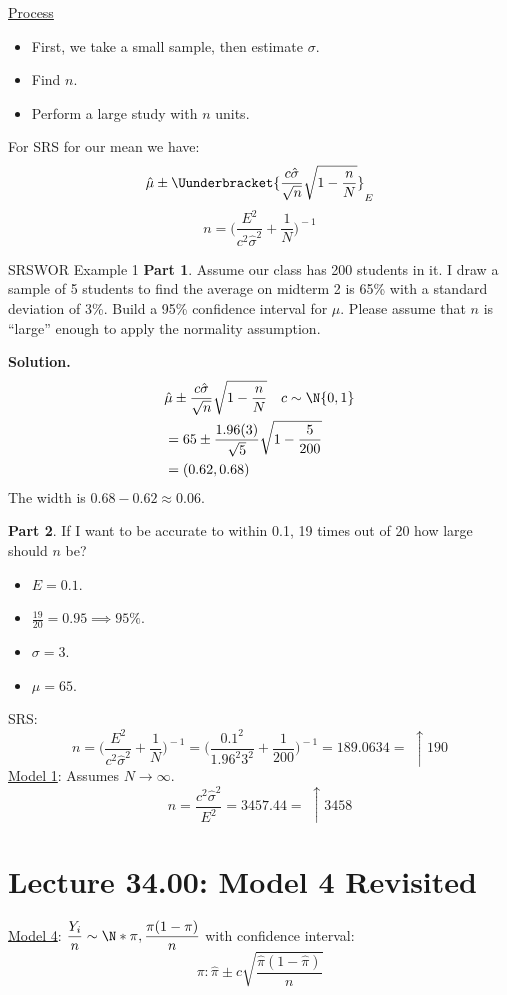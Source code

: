 \underline{Process}
\begin{itemize}
    \item First, we take a small sample, then estimate $ \sigma $.
    \item Find $ n $.
    \item Perform a large study with $ n $ units.
\end{itemize}
For SRS for our mean we have:
\[ \hat{\mu}\pm \Uunderbracket{\frac{c\hat{\sigma}}{\sqrt{n}}\sqrt{1-\frac{n}{N}}}_{E} \]
\[ n=\biggl(\frac{E^2}{c^2\hat{\sigma}^2}+\frac{1}{N} \biggr)^{\!-1} \]
\begin{Example}{SRSWOR Example 1}{}
    \textbf{Part 1}. Assume our class has 200 students in it.
    I draw a sample of 5 students to find the average on
    midterm 2 is 65\% with a standard deviation of 3\%.
    Build a 95\% confidence interval for $ \mu $. Please assume
    that $ n $ is ``large'' enough to apply the normality assumption.

    \textbf{Solution.}
    \begin{align*}
         & \hat{\mu}\pm \frac{c\hat{\sigma}}{\sqrt{n}}\sqrt{1-\frac{n}{N}}\quad c\sim \N{0,1} \\
         & =65\pm \frac{1.96(3)}{\sqrt{5}} \sqrt{1-\frac{5}{200} }                            \\
         & =(0.62,0.68)
    \end{align*}
    The width is $ 0.68-0.62\approx 0.06 $.

    \textbf{Part 2}.
    If I want to be accurate to within 0.1, 19 times out of 20 how large should $n$ be?
    \begin{itemize}
        \item $ E=0.1 $.
        \item $ \frac{19}{20} =0.95\implies 95\% $.
        \item $ \sigma=3 $.
        \item $ \mu=65 $.
    \end{itemize}
    SRS\@:
    \[ n=\biggl(\frac{E^2}{c^2\hat{\sigma}^2}+\frac{1}{N}  \biggr)^{\!-1}
        =\biggl(\frac{0.1^2}{1.96^2 3^2}+\frac{1}{200} \biggr)^{\!-1}=189.0634=\;\uparrow 190 \]
    \underline{Model 1}: Assumes $ N\to \infty $.
    \[ n=\frac{c^2\hat{\sigma}^2}{E^2}=3457.44=\;\uparrow 3458  \]
\end{Example}
\section{Lecture 34.00: Model 4 Revisited}
\underline{Model 4}: $ \displaystyle \frac{Y_i}{n} \sim \N*{\pi,\frac{\pi(1-\pi)}{n} } $
with confidence interval:
\[ \pi:\hat{\pi}\pm c\sqrt{\frac{\hat{\pi}(1-\hat{\pi})}{n} } \]
